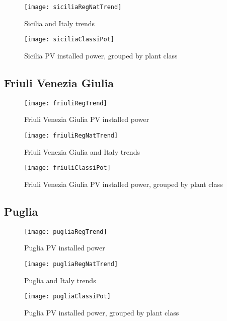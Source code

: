 \documentclass[12pt,a4paper,openright,twoside]{report}
\begin{document}
\begin{figure}[hp]
	\centering
	\texttt{[image: siciliaRegNatTrend]}
	\caption{Sicilia and Italy trends}
	\label{siciliaRegNatTrend}
\end{figure}

\begin{figure}[hp]
	\centering
	\texttt{[image: siciliaClassiPot]}
	\caption{Sicilia PV installed power, grouped by plant class}
	\label{siciliaClassiPot}
\end{figure}

\subsection*{Friuli Venezia Giulia}

\begin{figure}[hp]
	\centering
	\texttt{[image: friuliRegTrend]}
	\caption{Friuli Venezia Giulia PV installed power}
	\label{friuliRegTrend}
\end{figure}

\begin{figure}[hp]
	\centering
	\texttt{[image: friuliRegNatTrend]}
	\caption{Friuli Venezia Giulia and Italy trends}
	\label{friuliRegNatTrend}
\end{figure}

\begin{figure}[hp]
	\centering
	\texttt{[image: friuliClassiPot]}
	\caption{Friuli Venezia Giulia PV installed power, grouped by plant class}
	\label{friuliClassiPot}
\end{figure}

\clearpage

\subsection*{Puglia}

\begin{figure}[hp]
	\centering
	\texttt{[image: pugliaRegTrend]}
	\caption{Puglia PV installed power}
	\label{pugliaRegTrend}
\end{figure}

\begin{figure}[hp]
	\centering
	\texttt{[image: pugliaRegNatTrend]}
	\caption{Puglia and Italy trends}
	\label{pugliaRegNatTrend}
\end{figure}

\begin{figure}[hp]
	\centering
	\texttt{[image: pugliaClassiPot]}
	\caption{Puglia PV installed power, grouped by plant class}
	\label{pugliaClassiPot}
\end{figure}
\end{document}
